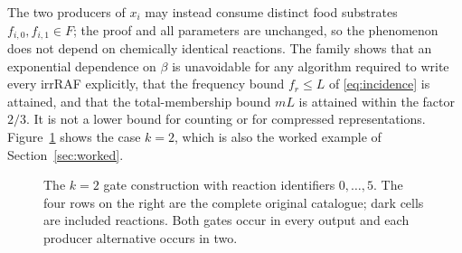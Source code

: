 \documentclass[11pt,a4paper]{article}
\theoremstyle{plain}
\theoremstyle{definition}
\theoremstyle{remark}
\begin{document}
The two producers of $x_i$ may instead consume distinct food substrates $f_{i,0},f_{i,1}\in F$; the proof and all parameters are unchanged, so the phenomenon does not depend on chemically identical reactions. The family shows that an exponential dependence on $\beta$ is unavoidable for any algorithm required to write every irrRAF explicitly, that the frequency bound $f_r\le L$ of \eqref{eq:incidence} is attained, and that the total-membership bound $mL$ is attained within the factor $2/3$. It is not a lower bound for counting or for compressed representations. Figure~\ref{fig:gate} shows the case $k=2$, which is also the worked example of Section~\ref{sec:worked}.

\begin{figure}[tb]
\centering
{}
\caption{The $k=2$ gate construction with reaction identifiers $0,\ldots,5$. The four rows on the right are the complete original catalogue; dark cells are included reactions. Both gates occur in every output and each producer alternative occurs in two.}
\label{fig:gate}
\end{figure}
\end{document}

